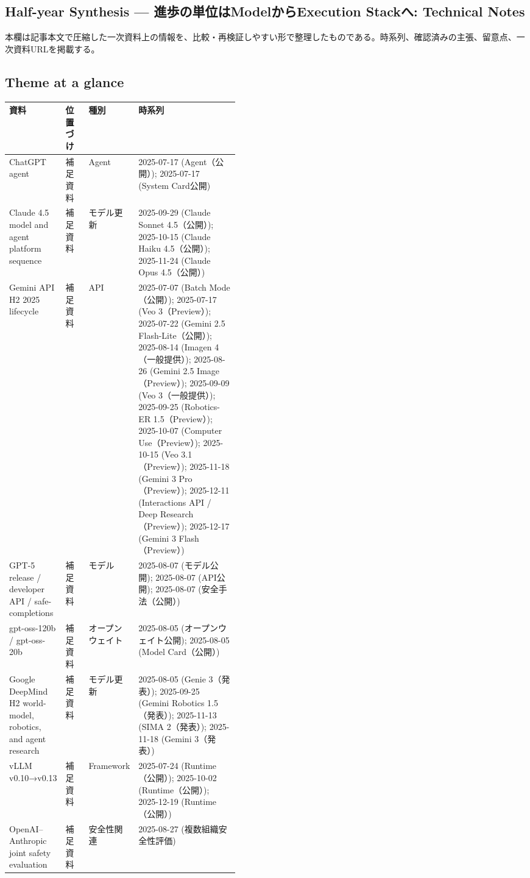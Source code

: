 \subsection*{Half-year Synthesis — 進歩の単位はModelからExecution Stackへ: Technical Notes}
本欄は記事本文で圧縮した一次資料上の情報を、比較・再検証しやすい形で整理したものである。時系列、確認済みの主張、留意点、一次資料URLを掲載する。
\medskip
\subsection*{Theme at a glance}
\begin{center}
\footnotesize
\begin{tabularx}{\linewidth}{@{}p{0.20\linewidth}p{0.10\linewidth}p{0.14\linewidth}X@{}}
\toprule
資料 & 位置づけ & 種別 & 時系列 \\
\midrule
ChatGPT agent & 補足資料 & Agent & 2025-07-17 (Agent（公開）); 2025-07-17 (System Card公開)      \\
Claude 4.5 model and agent platform sequence & 補足資料 & モデル更新 & 2025-09-29 (Claude Sonnet 4.5（公開）); 2025-10-15 (Claude Haiku 4.5（公開）); 2025-11-24 (Claude Opus 4.5（公開）)      \\
Gemini API H2 2025 lifecycle & 補足資料 & API & 2025-07-07 (Batch Mode（公開）); 2025-07-17 (Veo 3（Preview）); 2025-07-22 (Gemini 2.5 Flash-Lite（公開）); 2025-08-14 (Imagen 4（一般提供）); 2025-08-26 (Gemini 2.5 Image（Preview）); 2025-09-09 (Veo 3（一般提供）); 2025-09-25 (Robotics-ER 1.5（Preview）); 2025-10-07 (Computer Use（Preview）); 2025-10-15 (Veo 3.1（Preview）); 2025-11-18 (Gemini 3 Pro（Preview）); 2025-12-11 (Interactions API / Deep Research（Preview）); 2025-12-17 (Gemini 3 Flash（Preview）)      \\
GPT-5 release / developer API / safe-completions & 補足資料 & モデル & 2025-08-07 (モデル公開); 2025-08-07 (API公開); 2025-08-07 (安全手法（公開）)      \\
gpt-oss-120b / gpt-oss-20b & 補足資料 & オープンウェイト & 2025-08-05 (オープンウェイト公開); 2025-08-05 (Model Card（公開）)      \\
Google DeepMind H2 world-model, robotics, and agent research & 補足資料 & モデル更新 & 2025-08-05 (Genie 3（発表）); 2025-09-25 (Gemini Robotics 1.5（発表）); 2025-11-13 (SIMA 2（発表）); 2025-11-18 (Gemini 3（発表）)      \\
vLLM v0.10→v0.13 & 補足資料 & Framework & 2025-07-24 (Runtime（公開）); 2025-10-02 (Runtime（公開）); 2025-12-19 (Runtime（公開）)      \\
OpenAI–Anthropic joint safety evaluation & 補足資料 & 安全性関連 & 2025-08-27 (複数組織安全性評価)      \\
\bottomrule
\end{tabularx}
\end{center}
\normalsize

